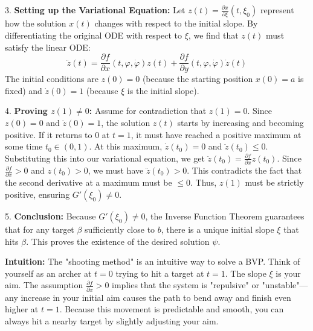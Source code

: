 \begin{solution}
3. \textbf{Setting up the Variational Equation:}
Let $z(t) = \frac{\partial x}{\partial \xi}(t, \xi_0)$ represent how the solution $x(t)$ changes with respect to the initial slope. By differentiating the original ODE with respect to $\xi$, we find that $z(t)$ must satisfy the linear ODE:
\[ \ddot{z}(t) = \frac{\partial f}{\partial x}(t, \varphi, \dot{\varphi}) z(t) + \frac{\partial f}{\partial y}(t, \varphi, \dot{\varphi}) \dot{z}(t) \]
The initial conditions are $z(0) = 0$ (because the starting position $x(0)=a$ is fixed) and $\dot{z}(0) = 1$ (because $\xi$ is the initial slope).

4. \textbf{Proving $z(1) \neq 0$:}
Assume for contradiction that $z(1) = 0$. Since $z(0)=0$ and $\dot{z}(0)=1$, the solution $z(t)$ starts by increasing and becoming positive. If it returns to $0$ at $t=1$, it must have reached a positive maximum at some time $t_0 \in (0, 1)$. At this maximum, $\dot{z}(t_0) = 0$ and $\ddot{z}(t_0) \leq 0$. Substituting this into our variational equation, we get $\ddot{z}(t_0) = \frac{\partial f}{\partial x} z(t_0)$. Since $\frac{\partial f}{\partial x} > 0$ and $z(t_0) > 0$, we must have $\ddot{z}(t_0) > 0$. This contradicts the fact that the second derivative at a maximum must be $\leq 0$. Thus, $z(1)$ must be strictly positive, ensuring $G'(\xi_0) \neq 0$.

5. \textbf{Conclusion:}
Because $G'(\xi_0) \neq 0$, the Inverse Function Theorem guarantees that for any target $\beta$ sufficiently close to $b$, there is a unique initial slope $\xi$ that hits $\beta$. This proves the existence of the desired solution $\psi$.

\textbf{Intuition:}
The "shooting method" is an intuitive way to solve a BVP. Think of yourself as an archer at $t=0$ trying to hit a target at $t=1$. The slope $\xi$ is your aim. The assumption $\frac{\partial f}{\partial x} > 0$ implies that the system is "repulsive" or "unstable"—any increase in your initial aim causes the path to bend away and finish even higher at $t=1$. Because this movement is predictable and smooth, you can always hit a nearby target by slightly adjusting your aim.
\end{solution}

